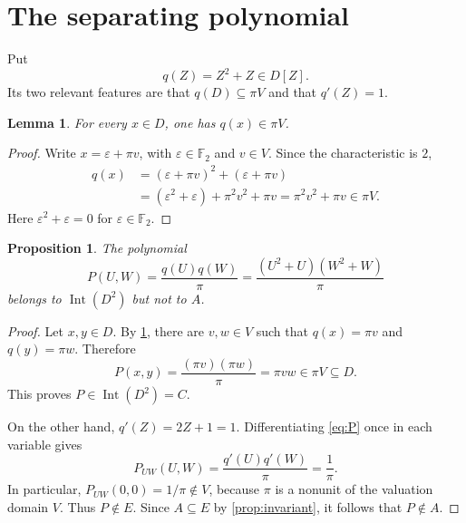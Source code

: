 \documentclass[11pt,reqno]{amsart}
\numberwithin{equation}{section}
\theoremstyle{plain}
\newtheorem{proposition}[theorem]{Proposition}
\newtheorem{lemma}[theorem]{Lemma}
\theoremstyle{definition}
\theoremstyle{remark}
\newcommand{\Int}{\operatorname{Int}}
\newcommand{\F}{\mathbb F}
\begin{document}
\section{The separating polynomial}
\label{sec:separation}

Put
\[
 q(Z)=Z^2+Z\in D[Z].
\]
Its two relevant features are that \(q(D)\subseteq\pi V\) and that
\(q'(Z)=1\).

\begin{lemma}\label{lem:q}
For every \(x\in D\), one has \(q(x)\in\pi V\).
\end{lemma}

\begin{proof}
Write \(x=\varepsilon+\pi v\), with
\(\varepsilon\in\F _2\) and \(v\in V\).  Since the characteristic is
\(2\),
\[
 \begin{aligned}
 q(x)
  &=(\varepsilon+\pi v)^2+(\varepsilon+\pi v)\\
  &=(\varepsilon^2+\varepsilon)+\pi^2v^2+\pi v
    =\pi^2v^2+\pi v\in\pi V.
 \end{aligned}
\]
Here \(\varepsilon^2+\varepsilon=0\) for
\(\varepsilon\in\F _2\).
\end{proof}

\begin{proposition}\label{prop:separation}
The polynomial
\begin{equation}
 P(U,W)=\frac{q(U)q(W)}{\pi}
       =\frac{(U^2+U)(W^2+W)}{\pi}
 \label{eq:P}
\end{equation}
belongs to \(\Int(D^2)\) but not to \(A\).
\end{proposition}

\begin{proof}
Let \(x,y\in D\).  By \cref{lem:q}, there are \(v,w\in V\) such
that \(q(x)=\pi v\) and \(q(y)=\pi w\).  Therefore
\[
 P(x,y)=\frac{(\pi v)(\pi w)}{\pi}
       =\pi vw\in\pi V\subseteq D.
\]
This proves \(P\in\Int(D^2)=C\).

On the other hand, \(q'(Z)=2Z+1=1\).  Differentiating
\eqref{eq:P} once in each variable gives
\[
 P_{UW}(U,W)=\frac{q'(U)q'(W)}{\pi}=\frac1\pi.
\]
In particular, \(P_{UW}(0,0)=1/\pi\notin V\), because \(\pi\) is a
nonunit of the valuation domain \(V\).  Thus \(P\notin E\).  Since
\(A\subseteq E\) by \cref{prop:invariant}, it follows that
\(P\notin A\).
\end{proof}
\end{document}

